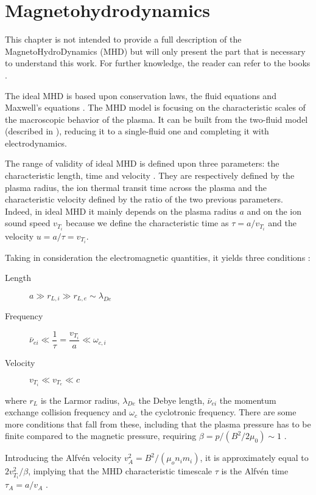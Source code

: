 \chapter{Magnetohydrodynamics}\label{sec:MHD}\thispagestyle{fancy}
This chapter is not intended to provide a full description of the MagnetoHydroDynamics (MHD) but will only present the part that is necessary to understand this work. For further knowledge, the reader can refer to the books \cite{freidberg,boyd-sanderson,freidberg2,wesson}.

The ideal MHD is based upon conservation laws, the fluid equations and Maxwell's equations \cite{freidberg}. The MHD model is focusing on the characteristic scales of the macroscopic behavior of the plasma. It can be built from the two-fluid model (described in \cite{freidberg}), reducing it to a single-fluid one and completing it with electrodynamics.

The range of validity of ideal MHD is defined upon three parameters: the characteristic length, time and velocity \cite{freidberg}. They are respectively defined by the plasma radius, the ion thermal transit time across the plasma and the characteristic velocity defined by the ratio of the two previous parameters. Indeed, in ideal MHD it mainly depends on the plasma radius $a$ and on the ion sound speed $v_{T_i}$ because we define the characteristic time as $\tau = a / v_{T_i}$ and the velocity $u = a / \tau = v_{T_i}$.

Taking in consideration the electromagnetic quantities, it yields three conditions \cite{freidberg}:
\begin{description}
	\item[Length]    $a \gg r_{L,i} \gg r_{L,e} \sim \lambda_{De}$
	\item[Frequency] $\bar{\nu}_{ei} \ll \dfrac{1}{\tau} = \dfrac{v_{T_i}}{a} \ll \omega_{c,i}$
	\item[Velocity]  $v_{T_i} \ll v_{T_e} \ll c$
\end{description}
where $r_L$ is the Larmor radius, $\lambda_{De}$ the Debye length, $\bar{\nu}_{ei}$ the momentum exchange collision frequency and $\omega_c$ the cyclotronic frequency. There are some more conditions that fall from these, including that the plasma pressure has to be finite compared to the magnetic pressure, requiring $\beta = p / ( B^2 / 2 \mu_0 ) \sim 1$ \cite{freidberg}.

Introducing the Alfv\'en velocity $v_A^2 = B^2 / ( \mu_o n_i m_i )$, it is approximately equal to $2 v_{T_i}^2 / \beta$, implying that the MHD characteristic timescale $\tau$ is the Alfv\'en time $\tau_A = a / v_A$ \cite{boyd-sanderson}.

